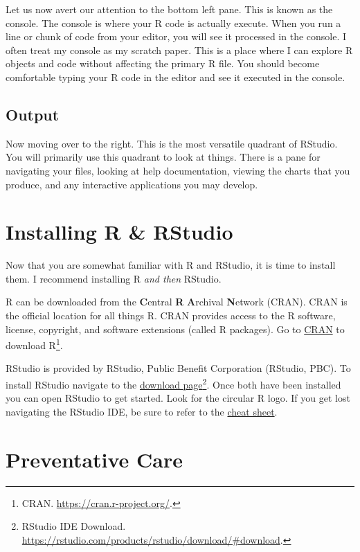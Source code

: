 \documentclass[
]{book}
\begin{document}
Let us now avert our attention to the bottom left pane. This is known as the console. The console is where your R code is actually execute. When you run a line or chunk of code from your editor, you will see it processed in the console. I often treat my console as my scratch paper. This is a place where I can explore R objects and code without affecting the primary R file. You should become comfortable typing your R code in the editor and see it executed in the console.

\hypertarget{output}{%
\subsection{Output}\label{output}}

Now moving over to the right. This is the most versatile quadrant of RStudio. You will primarily use this quadrant to look at things. There is a pane for navigating your files, looking at help documentation, viewing the charts that you produce, and any interactive applications you may develop.

\hypertarget{installing-r-rstudio}{%
\section{Installing R \& RStudio}\label{installing-r-rstudio}}

Now that you are somewhat familiar with R and RStudio, it is time to install them. I recommend installing R \emph{and then} RStudio.

R can be downloaded from the \textbf{C}entral \textbf{R} \textbf{A}rchival \textbf{N}etwork (CRAN). CRAN is the official location for all things R. CRAN provides access to the R software, license, copyright, and software extensions (called R packages). Go to \href{https://cran.r-project.org/}{CRAN} to download R\footnote{CRAN. \url{https://cran.r-project.org/}.}.

RStudio is provided by RStudio, Public Benefit Corporation (RStudio, PBC). To install RStudio navigate to the \href{https://rstudio.com/products/rstudio/download/\#download}{download page}\footnote{RStudio IDE Download. \url{https://rstudio.com/products/rstudio/download/\#download}.}.
Once both have been installed you can open RStudio to get started. Look for the circular R logo. If you get lost navigating the RStudio IDE, be sure to refer to the \href{https://github.com/rstudio/cheatsheets/raw/master/rstudio-ide.pdf}{cheat sheet}.

\hypertarget{preventative-care}{%
\section{Preventative Care}\label{preventative-care}}
\end{document}
